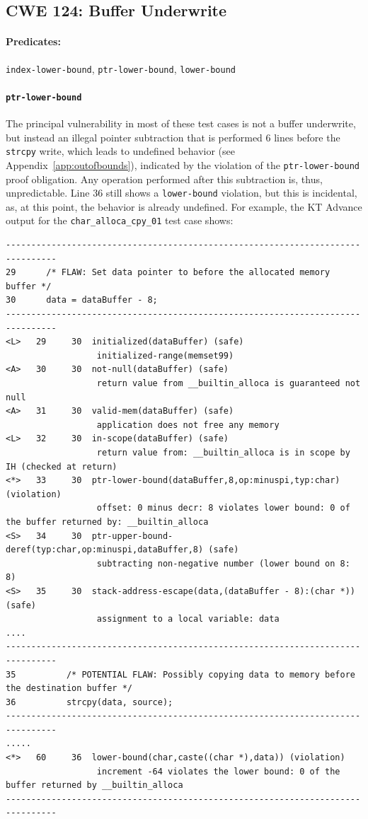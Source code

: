 \documentclass[11pt]{article}
\begin{document}
\subsection{CWE 124: Buffer Underwrite}

\paragraph{Predicates:} {\tt index-lower-bound}, {\tt ptr-lower-bound},
{\tt lower-bound}

\paragraph{\tt ptr-lower-bound}
The principal vulnerability in most of these test cases is not a buffer underwrite,
but instead an illegal pointer subtraction that is performed 6 lines before the {\tt strcpy}
write, which leads to undefined behavior (see Appendix~\ref{app:outofbounds}), indicated by
the violation of the {\tt ptr-lower-bound}  proof obligation. Any operation performed
after this subtraction is, thus, unpredictable. Line 36 still shows a {\tt lower-bound}
violation, but this is incidental, as, at this point, the behavior is already undefined.
For example, the KT Advance output for the {\tt char\_alloca\_cpy\_01} test case shows:

\begin{tiny}
\begin{verbatim}
--------------------------------------------------------------------------------
29      /* FLAW: Set data pointer to before the allocated memory buffer */
30      data = dataBuffer - 8;
--------------------------------------------------------------------------------
<L>   29     30  initialized(dataBuffer) (safe)
                  initialized-range(memset99)
<A>   30     30  not-null(dataBuffer) (safe)
                  return value from __builtin_alloca is guaranteed not null
<A>   31     30  valid-mem(dataBuffer) (safe)
                  application does not free any memory
<L>   32     30  in-scope(dataBuffer) (safe)
                  return value from: __builtin_alloca is in scope by IH (checked at return)
<*>   33     30  ptr-lower-bound(dataBuffer,8,op:minuspi,typ:char) (violation)
                  offset: 0 minus decr: 8 violates lower bound: 0 of the buffer returned by: __builtin_alloca
<S>   34     30  ptr-upper-bound-deref(typ:char,op:minuspi,dataBuffer,8) (safe)
                  subtracting non-negative number (lower bound on 8: 8)
<S>   35     30  stack-address-escape(data,(dataBuffer - 8):(char *)) (safe)
                  assignment to a local variable: data
....
--------------------------------------------------------------------------------
35          /* POTENTIAL FLAW: Possibly copying data to memory before the destination buffer */
36          strcpy(data, source);
--------------------------------------------------------------------------------
.....
<*>   60     36  lower-bound(char,caste((char *),data)) (violation)
                  increment -64 violates the lower bound: 0 of the buffer returned by __builtin_alloca
--------------------------------------------------------------------------------
\end{verbatim}
\end{tiny}
\end{document}
